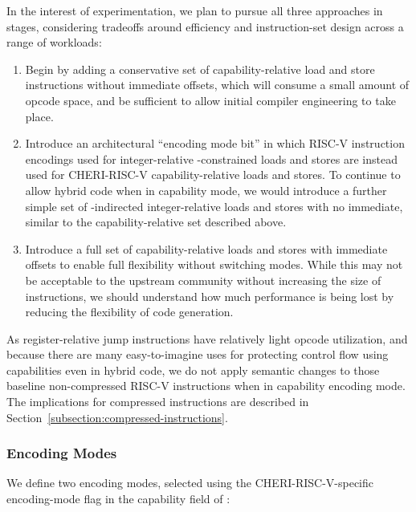 \noindent
In the interest of experimentation, we plan to pursue all three approaches
in stages, considering tradeoffs around efficiency and instruction-set design
across a range of workloads:

\begin{enumerate}
\item Begin by adding a conservative set of capability-relative load and store
instructions without immediate offsets, which will consume a small amount of
opcode space, and be sufficient to allow initial compiler engineering to take
place.

\item Introduce an architectural ``encoding mode bit'' in which RISC-V
instruction encodings used for integer-relative \DDC{}-constrained loads and
stores are instead used for CHERI-RISC-V capability-relative loads and stores.
To continue to allow hybrid code when in capability mode, we would introduce a
further simple set of \DDC{}-indirected integer-relative loads and stores with
no immediate, similar to the capability-relative set described above.

\item Introduce a full set of capability-relative loads and stores
with immediate offsets to enable full flexibility without switching modes.
While this may not be acceptable to the upstream community without increasing
the size of instructions, we should understand how much performance is being
lost by reducing the flexibility of code generation.
\end{enumerate}

As register-relative jump instructions have relatively light opcode
utilization, and because there are many easy-to-imagine uses for protecting
control flow using capabilities even in hybrid code, we do not apply semantic
changes to those baseline non-compressed RISC-V instructions when in
capability encoding mode.
The implications for compressed instructions are described in
Section~\ref{subsection:compressed-instructions}.

\subsubsection{Encoding Modes}
\label{sec:cheri-riscv-encmodes}


We define two encoding modes, selected using the CHERI-RISC-V-specific
encoding-mode flag in the capability \cflags{} field of \PCC{}:

